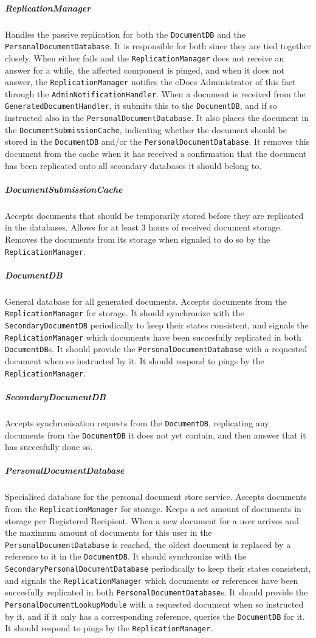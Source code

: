 \documentclass[a4paper,10pt]{article}
\begin{document}
\subparagraph{ReplicationManager}
Handles the passive replication for both the \texttt{DocumentDB} and the \texttt{PersonalDocumentDatabase}. It is responsible for both since they are tied together closely. When either fails and the \texttt{ReplicationManager} does not receive an answer for a while, the affected component is pinged, and when it does not answer, the \texttt{ReplicationManager} notifies the eDocs Administrator of this fact through the \texttt{AdminNotificationHandler}. When a document is received from the \texttt{GeneratedDocumentHandler}, it submits this to the \texttt{DocumentDB}, and if so instructed also in the \texttt{PersonalDocumentDatabase}. It also places the document in the \texttt{DocumentSubmissionCache}, indicating whether the document should be stored in the \texttt{DocumentDB} and/or the \texttt{PersonalDocumentDatabase}. It removes this document from the cache when it has received a confirmation that the document has been replicated onto all secondary databases it should belong to.

\subparagraph{DocumentSubmissionCache}
Accepts documents that should be temporarily stored before they are replicated in the databases. Allows for at least 3 hours of received document storage. Removes the documents from its storage when signaled to do so by the \texttt{ReplicationManager}.

\subparagraph{DocumentDB}
General database for all generated documents. Accepts documents from the \texttt{ReplicationManager} for storage. It should synchronize with the \texttt{SecondaryDocumentDB} periodically to keep their states consistent, and signals the \texttt{ReplicationManager} which documents have been succesfully replicated in both \texttt{DocumentDB}s. It should provide the \texttt{PersonalDocumentDatabase} with a requested document when so instructed by it. It should respond to pings by the \texttt{ReplicationManager}.

\subparagraph{SecondaryDocumentDB}
Accepts synchronisation requests from the \texttt{DocumentDB}, replicating any documents from the \texttt{DocumentDB} it does not yet contain, and then answer that it has succesfully done so.

\subparagraph{PersonalDocumentDatabase}
Specialised database for the personal document store service. Accepts documents from the \texttt{ReplicationManager} for storage. Keeps a set amount of documents in storage per Registered Recipient. When a new document for a user arrives and the maximum amount of documents for this user in the \texttt{PersonalDocumentDatabase} is reached, the oldest document is replaced by a reference to it in the \texttt{DocumentDB}. It should synchronize with the \texttt{SecondaryPersonalDocumentDatabase} periodically to keep their states consistent, and signals the \texttt{ReplicationManager} which documents or references have been succesfully replicated in both \texttt{PersonalDocumentDatabase}s. It should provide the \texttt{PersonalDocumentLookupModule} with a requested document when so instructed by it, and if it only has a corresponding reference, queries the \texttt{DocumentDB} for it. It should respond to pings by the \texttt{ReplicationManager}.
\end{document}
